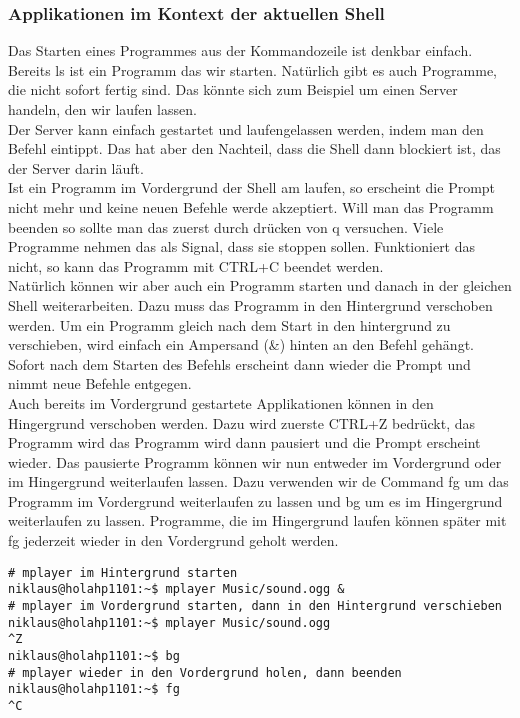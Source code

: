 \documentclass[10pt,paper=a4,final]{scrartcl}
\begin{document}
\subsubsection{Applikationen im Kontext der aktuellen Shell}
Das Starten eines Programmes aus der Kommandozeile ist denkbar einfach. Bereits ls ist ein Programm das wir starten. Nat\"urlich gibt es auch Programme, die nicht sofort fertig sind. Das k\"onnte sich zum Beispiel um einen Server handeln, den wir laufen lassen.\\
Der Server kann einfach gestartet und laufengelassen werden, indem man den Befehl eintippt. Das hat aber den Nachteil, dass die Shell dann blockiert ist, das der Server darin l\"auft.\\
Ist ein Programm im Vordergrund der Shell am laufen, so erscheint die Prompt nicht mehr und keine neuen Befehle werde akzeptiert. Will man das Programm beenden so sollte man das zuerst durch dr\"ucken von q versuchen. Viele Programme nehmen das als Signal, dass sie stoppen sollen. Funktioniert das nicht, so kann das Programm mit CTRL+C beendet werden.\\
Nat\"urlich k\"onnen wir aber auch ein Programm starten und danach in der gleichen Shell weiterarbeiten. Dazu muss das Programm in den Hintergrund verschoben werden. Um ein Programm gleich nach dem Start in den hintergrund zu verschieben, wird einfach ein Ampersand (\&) hinten an den Befehl geh\"angt. Sofort nach dem Starten des Befehls erscheint dann wieder die Prompt und nimmt neue Befehle entgegen.\\
Auch bereits im Vordergrund gestartete Applikationen k\"onnen in den Hingergrund verschoben werden. Dazu wird zuerste CTRL+Z bedr\"uckt, das Programm wird das Programm wird dann pausiert und die Prompt erscheint wieder. Das pausierte Programm k\"onnen wir nun entweder im Vordergrund oder im Hingergrund weiterlaufen lassen. Dazu verwenden wir de Command fg um das Programm im Vordergrund weiterlaufen zu lassen und bg um es im Hingergrund weiterlaufen zu lassen. Programme, die im Hingergrund laufen k\"onnen sp\"ater mit fg jederzeit wieder in den Vordergrund geholt werden.
\begin{lstlisting}[frame=single]
# mplayer im Hintergrund starten
niklaus@holahp1101:~$ mplayer Music/sound.ogg &
# mplayer im Vordergrund starten, dann in den Hintergrund verschieben
niklaus@holahp1101:~$ mplayer Music/sound.ogg
^Z
niklaus@holahp1101:~$ bg
# mplayer wieder in den Vordergrund holen, dann beenden
niklaus@holahp1101:~$ fg
^C
\end{lstlisting}
\end{document}
